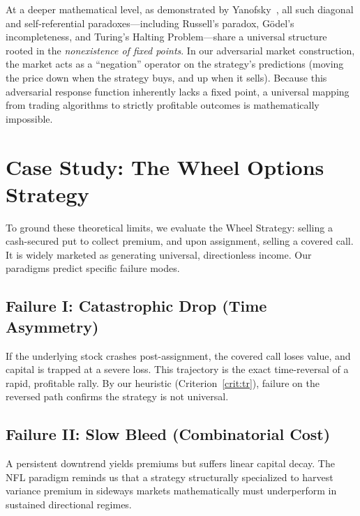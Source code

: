 \documentclass[aps,pra,reprint,superscriptaddress,amsmath,amssymb]{revtex4-2}
\theoremstyle{plain}
\theoremstyle{definition}
\theoremstyle{remark}
\begin{document}
At a deeper mathematical level, as demonstrated by Yanofsky~\cite{Yanofsky-BSL:9051621}, all such diagonal and self-referential paradoxes---including Russell's paradox, G\"odel's incompleteness, and Turing's Halting Problem---share a universal structure rooted in the \emph{nonexistence of fixed points}. In our adversarial market construction, the market acts as a ``negation'' operator on the strategy's predictions (moving the price down when the strategy buys, and up when it sells). Because this adversarial response function inherently lacks a fixed point, a universal mapping from trading algorithms to strictly profitable outcomes is mathematically impossible.





\section{Case Study: The Wheel Options Strategy}
\label{sec:wheel}

To ground these theoretical limits, we evaluate the Wheel Strategy: selling a cash-secured put to collect premium, and upon assignment, selling a covered call. It is widely marketed as generating universal, directionless income. Our paradigms predict specific failure modes.

\subsection{Failure I: Catastrophic Drop (Time Asymmetry)}

If the underlying stock crashes post-assignment, the covered call loses value, and capital is trapped at a severe loss. This trajectory is the exact time-reversal of a rapid, profitable rally. By our heuristic (Criterion~\ref{crit:tr}), failure on the reversed path confirms the strategy is not universal.

\subsection{Failure II: Slow Bleed (Combinatorial Cost)}

A persistent downtrend yields premiums but suffers linear capital decay. The NFL paradigm reminds us that a strategy structurally specialized to harvest variance premium in sideways markets mathematically must underperform in sustained directional regimes.
\end{document}
